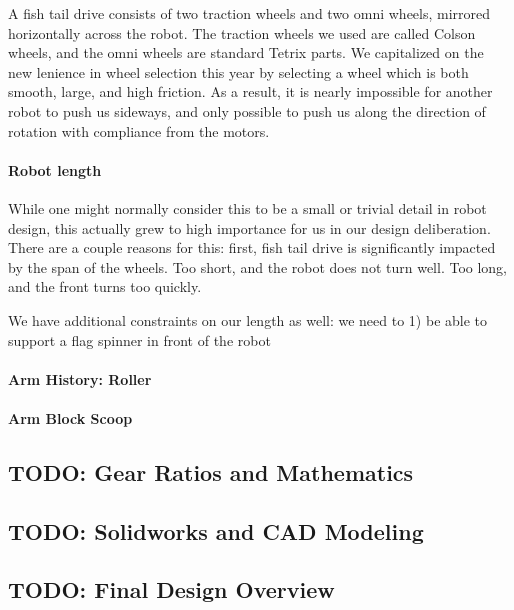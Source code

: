 A fish tail drive consists of two traction wheels and two omni wheels, mirrored horizontally across the robot. The traction wheels we used are called Colson wheels, and the omni wheels are standard Tetrix parts. We capitalized on the new lenience in wheel selection this year by selecting a wheel which is both smooth, large, and high friction. As a result, it is nearly impossible for another robot to push us sideways, and only possible to push us along the direction of rotation with compliance from the motors.

\paragraph{Robot length} While one might normally consider this to be a small or trivial detail in robot design, this actually grew to high importance for us in our design deliberation. There are a couple reasons for this: first, fish tail drive is significantly impacted by the span of the wheels. Too short, and the robot does not turn well. Too long, and the front turns too quickly.

We have additional constraints on our length as well: we need to 1) be able to support a flag spinner in front of the robot

\paragraph{Arm History: Roller}
\paragraph{Arm Block Scoop}

\newpage \subsection{TODO: Gear Ratios and Mathematics}
\newpage \subsection{TODO: Solidworks and CAD Modeling}
\newpage \subsection{TODO: Final Design Overview}

